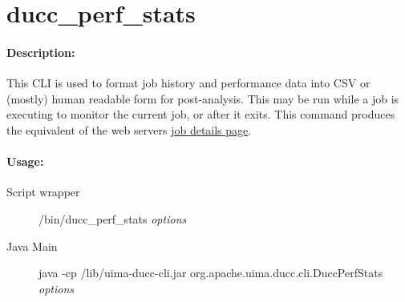 \ifpdf
\else
{}
\fi
    \section{ducc\_perf\_stats}
    \label{sec:cli.ducc-perf-stats}
    \paragraph{Description:}
    This CLI is used to format job history and performance data into CSV or (mostly) human readable
    form for post-analysis.  This may be run while a job is executing to monitor the current job, or
    after it exits.  This command produces the equivalent of the web servers
    \hyperref[sec:ws-job-details]{job details page}.

    \paragraph{Usage:}
    \begin{description}
    \item[Script wrapper] \ducchome/bin/ducc\_perf\_stats {\em options}
    \item[Java Main]      java -cp \ducchome/lib/uima-ducc-cli.jar org.apache.uima.ducc.cli.DuccPerfStats {\em options}
    \end{description}

